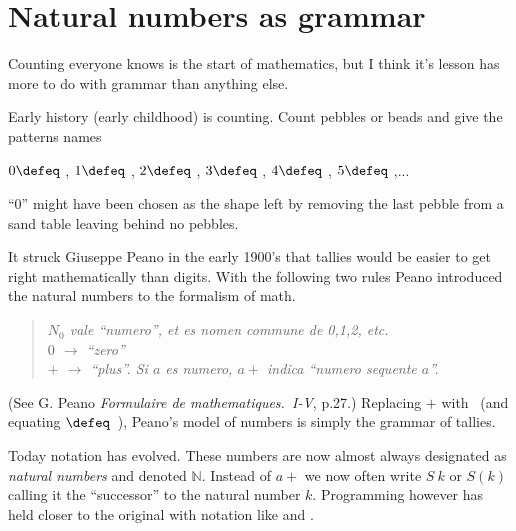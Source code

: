 \section{Natural numbers as grammar}
Counting everyone knows is the start of mathematics, but I think it's lesson 
has more to do with grammar than anything else. 

Early history (early childhood) is counting.  Count 
pebbles or beads and give the patterns names
\begin{center}
    $0\defeq$ \underline{\hspace{5mm}}, 
    $1\defeq$ \StrokeOne,
    $2\defeq$ \StrokeTwo,
    $3\defeq$ \StrokeThree,
    $4\defeq$ \StrokeFour,
    $5\defeq$ \StrokeFive,...
\end{center}
``0'' might have been chosen as the shape left by removing the last pebble from
a sand table leaving behind no pebbles.

It struck Giuseppe Peano in the early 1900's that tallies 
would be easier to get right mathematically than digits. With the following two rules
Peano introduced the natural numbers to the formalism of math.
\begin{quote}
    \textit{
    $N_0$ vale ``numero'', et es nomen commune de 0,1,2, etc.\\
    $0$ $\to$  ``zero''\\
    $+$ $\to$ ``plus''.  Si $a$ es numero, $a+$ indica ``numero sequente $a$''.
    }
\end{quote}
(See G. Peano \emph{Formulaire de mathematiques.~I-V}, p.27.)
Replacing $+$ with \StrokeOne ~(and equating \StrokeFive$\defeq$\StrokeFour~\StrokeOne),
Peano's model of numbers is simply the grammar of tallies.

Today notation has evolved.  These numbers are now almost always designated as
\emph{natural numbers} and denoted $\mathbb{N}$.  Instead of $a+$ we now 
often write $S~k$  or $S(k)$ calling it the ``successor'' to the natural number $k$.  
Programming however has held closer to the original with notation like 
 and .

